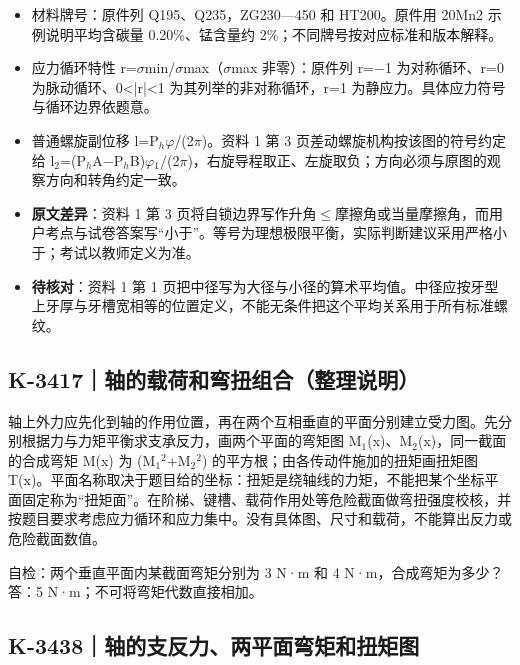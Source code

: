 \documentclass[zihao=5,a4paper,UTF8,fontset=fandol]{ctexart}
\begin{document}
\begin{itemize}
\item 
材料牌号：原件列 Q195、Q235，ZG230—450 和 HT200。原件用 20Mn2 示例说明平均含碳量 0.20\%、锰含量约 2\%；不同牌号按对应标准和版本解释。


\item 
应力循环特性 r=$\sigma$min/$\sigma$max（$\sigma$max 非零）：原件列 r=$-$1 为对称循环、r=0 为脉动循环、0<|r|<1 为其列举的非对称循环，r=1 为静应力。具体应力符号与循环边界依题意。


\item 
普通螺旋副位移 l=P$_{h}$$\varphi$/(2$\pi$)。资料 1 第 3 页差动螺旋机构按该图的符号约定给 l$_{2}$=(P$_{h}$A$-$P$_{h}$B)$\varphi$$_{1}$/(2$\pi$)，右旋导程取正、左旋取负；方向必须与原图的观察方向和转角约定一致。


\item 
\textbf{原文差异}：资料 1 第 3 页将自锁边界写作升角$\le$摩擦角或当量摩擦角，而用户考点与试卷答案写“小于”。等号为理想极限平衡，实际判断建议采用严格小于；考试以教师定义为准。


\item 
\textbf{待核对}：资料 1 第 1 页把中径写为大径与小径的算术平均值。中径应按牙型上牙厚与牙槽宽相等的位置定义，不能无条件把这个平均关系用于所有标准螺纹。



\end{itemize}




\subsection{K-3417｜轴的载荷和弯扭组合（整理说明）}
\label{k-3417}

轴上外力应先化到轴的作用位置，再在两个互相垂直的平面分别建立受力图。先分别根据力与力矩平衡求支承反力，画两个平面的弯矩图 M$_{1}$(x)、M$_{2}$(x)，同一截面的合成弯矩 M(x) 为 (M$_{1}$$^{2}$+M$_{2}$$^{2}$) 的平方根；由各传动件施加的扭矩画扭矩图 T(x)。平面名称取决于题目给的坐标：扭矩是绕轴线的力矩，不能把某个坐标平面固定称为“扭矩面”。在阶梯、键槽、载荷作用处等危险截面做弯扭强度校核，并按题目要求考虑应力循环和应力集中。没有具体图、尺寸和载荷，不能算出反力或危险截面数值。


自检：两个垂直平面内某截面弯矩分别为 3 N·m 和 4 N·m，合成弯矩为多少？答：5 N·m；不可将弯矩代数直接相加。





\subsection{K-3438｜轴的支反力、两平面弯矩和扭矩图}
\label{k-3438}
\end{document}
